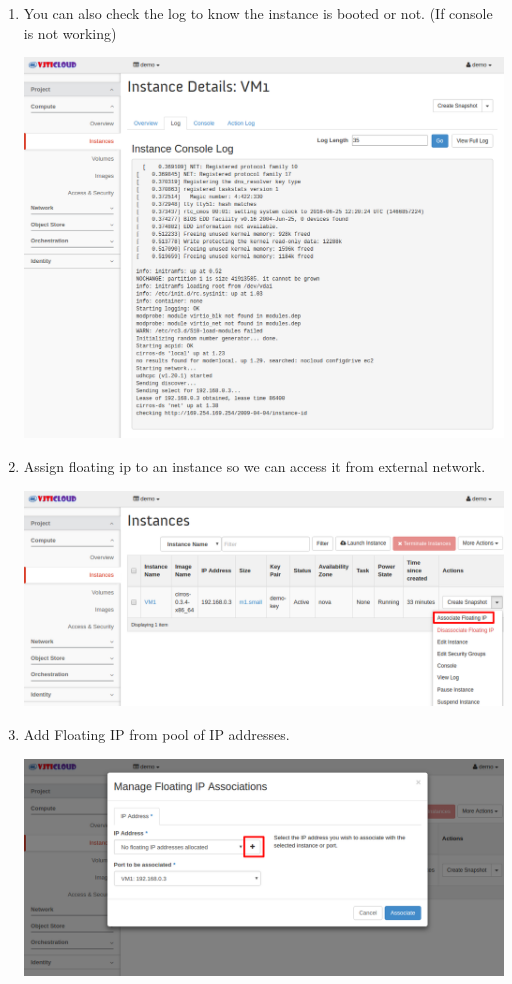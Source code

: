 \documentclass[letterpaper,10pt,english]{sphinxmanual}
\begin{document}
\begin{enumerate}
\item {} 
You can also check the log to know the instance is booted or not. (If console is not working)

\includegraphics{instances-launch-log.png}

\item {} 
Assign floating ip to an instance so we can access it from external network.

\includegraphics{instances-access-floating-ip.png}

\item {} 
Add Floating IP from pool of IP addresses.

\includegraphics{instances-access-floating-ip-range.png}


\end{enumerate}
\end{document}
